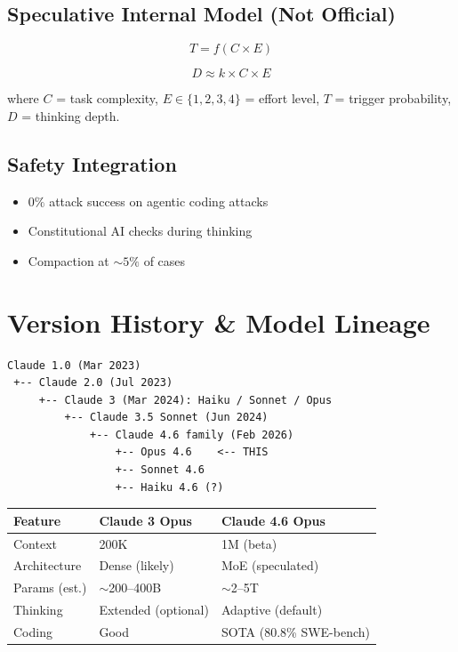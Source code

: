 \documentclass[11pt,a4paper]{article}
\begin{document}
\subsection{Speculative Internal Model (Not Official)}

$$T = f(C \times E)$$

$$D \approx k \times C \times E$$

where $C$ = task complexity, $E \in \{1, 2, 3, 4\}$ = effort level, $T$ = trigger probability, $D$ = thinking depth.

\subsection{Safety Integration}

\begin{itemize}
  \item $0\%$ attack success on agentic coding attacks
  \item Constitutional AI checks during thinking
  \item Compaction at $\sim 5\%$ of cases
\end{itemize}

\section{Version History \& Model Lineage}

\begin{lstlisting}
Claude 1.0 (Mar 2023)
 +-- Claude 2.0 (Jul 2023)
     +-- Claude 3 (Mar 2024): Haiku / Sonnet / Opus
         +-- Claude 3.5 Sonnet (Jun 2024)
             +-- Claude 4.6 family (Feb 2026)
                 +-- Opus 4.6    <-- THIS
                 +-- Sonnet 4.6
                 +-- Haiku 4.6 (?)
\end{lstlisting}

\begin{center}
\begin{tabular}{lll}
\toprule
\textbf{Feature} & \textbf{Claude 3 Opus} & \textbf{Claude 4.6 Opus} \\
\midrule
Context & 200K & 1M (beta) \\
Architecture & Dense (likely) & MoE (speculated) \\
Params (est.) & $\sim$200--400B & $\sim$2--5T \\
Thinking & Extended (optional) & Adaptive (default) \\
Coding & Good & SOTA (80.8\% SWE-bench) \\
\bottomrule
\end{tabular}
\end{center}
\end{document}
